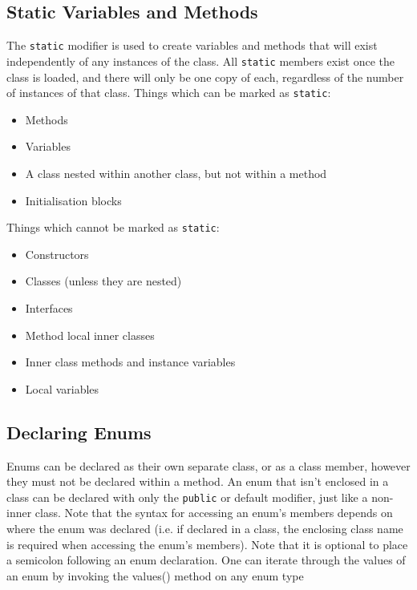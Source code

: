 \subsection{Static Variables and Methods}
The \verb#static# modifier is used to create variables and methods that will 
exist independently of any instances of the class. All \verb#static# members 
exist once the class is loaded, and there will only be one copy of each, 
regardless of the number of instances of that class. Things which can be marked 
as \verb#static#:
\begin{itemize}
    \item Methods
    \item Variables
    \item A class nested within another class, but not within a method
    \item Initialisation blocks
\end{itemize}
Things which cannot be marked as \verb#static#:
\begin{itemize}
    \item Constructors
    \item Classes (unless they are nested)
    \item Interfaces
    \item Method local inner classes
    \item Inner class methods and instance variables
    \item Local variables
\end{itemize}

\subsection{Declaring Enums}
Enums can be declared as their own separate class, or as a class member, 
however they must not be declared within a method. An enum that isn't enclosed 
in a class can be declared with only the \verb#public# or default modifier, 
just like a non-inner class. Note that the syntax for accessing an enum's 
members depends on where the enum was declared (i.e. if declared in a class, 
the enclosing class name is required when accessing the enum's members). Note 
that it is optional to place a semicolon following an enum declaration. One can 
iterate through the values of an enum by invoking the values() method on any 
enum type

